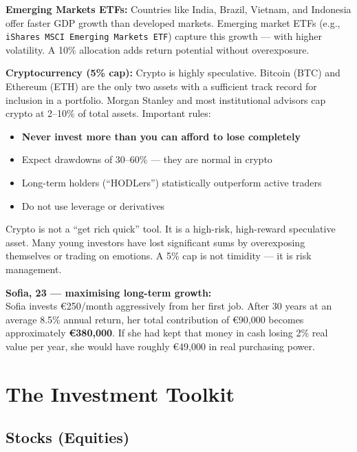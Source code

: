 \documentclass[12pt, a4paper]{book}
\begin{document}
\textbf{Emerging Markets ETFs:} Countries like India, Brazil, Vietnam, and Indonesia offer faster GDP growth than developed markets. Emerging market ETFs (e.g., \texttt{iShares MSCI Emerging Markets ETF}) capture this growth --- with higher volatility. A 10\% allocation adds return potential without overexposure.

\textbf{Cryptocurrency (5\% cap):} Crypto is highly speculative. Bitcoin (BTC) and Ethereum (ETH) are the only two assets with a sufficient track record for inclusion in a portfolio. Morgan Stanley and most institutional advisors cap crypto at 2--10\% of total assets. Important rules:
\begin{itemize}[leftmargin=1.5cm]
  \item \textbf{Never invest more than you can afford to lose completely}
  \item Expect drawdowns of 30--60\% --- they are normal in crypto
  \item Long-term holders (``HODLers'') statistically outperform active traders
  \item Do not use leverage or derivatives
\end{itemize}

\begin{warningbox}
Crypto is not a ``get rich quick'' tool. It is a high-risk, high-reward speculative asset. Many young investors have lost significant sums by overexposing themselves or trading on emotions. A 5\% cap is not timidity --- it is risk management.
\end{warningbox}

\begin{examplebox}
\textbf{Sofia, 23 --- maximising long-term growth:}\\
Sofia invests \euro{}250/month aggressively from her first job. After 30 years at an average 8.5\% annual return, her total contribution of \euro{}90{,}000 becomes approximately \textbf{\euro{}380{,}000}. If she had kept that money in cash losing 2\% real value per year, she would have roughly \euro{}49{,}000 in real purchasing power.
\end{examplebox}

\chapter{The Investment Toolkit}

\section{Stocks (Equities)}
\end{document}
